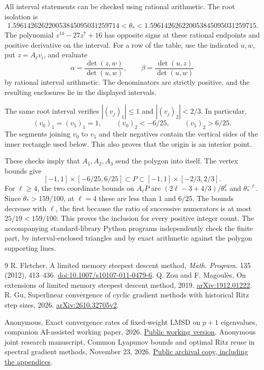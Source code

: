 \documentclass[11pt,a4paper]{article}
\numberwithin{equation}{section}
\begin{document}
All interval statements can be checked using rational arithmetic. The root isolation is
\[
\begin{split}
1.596142626220053845095031259714
 <\theta_*<
1.596142626220053845095031259715.
\end{split}
\]
The polynomial \(z^{14}-27z^7+16\) has opposite signs at these rational endpoints and positive derivative on the interval. For a row of the table, use the indicated \(u,w\), put \(z=A_\ell v_i\), and evaluate
\[
 \alpha=\frac{\det(z,w)}{\det(u,w)},\qquad
 \beta=\frac{\det(u,z)}{\det(u,w)}
\]
by rational interval arithmetic. The denominators are strictly positive, and the resulting enclosures lie in the displayed intervals.

The same root interval verifies \(|(v_j)_1|\le1\) and \(|(v_j)_2|<2/3\).
In particular,
\[
 (v_0)_1=(v_5)_1=1,\qquad
 (v_0)_2<-6/25,\qquad (v_5)_2>6/25.
\]
The segments joining \(v_0\) to \(v_5\) and their negatives contain the vertical sides of the inner rectangle used below. This also proves that the origin is an interior point.


These checks imply that \(A_1,A_2,A_3\) send the polygon into itself. The vertex bounds give
\[
 [-1,1]\times[-6/25,6/25]\subset P\subset[-1,1]\times[-2/3,2/3].
\]
For \(\ell\ge4\), the two coordinate bounds on \(A_\ell P\) are \((2\ell-3+4/3)/\theta_*^\ell\) and \(\theta_*^{-\ell}\). Since \(\theta_*>159/100\), at \(\ell=4\) these are less than \(1\) and \(6/25\). The bounds decrease with \(\ell\), the first because the ratio of successive numerators is at most \(25/19<159/100\). This proves the inclusion for every positive integer count. The accompanying standard-library Python programs independently check the finite part, by interval-enclosed triangles and by exact arithmetic against the polygon supporting lines.

\clearpage
\begin{thebibliography}{9}\setlength{\itemsep}{3pt}
 R. Fletcher, A limited memory steepest descent method, \emph{Math. Program.} 135 (2012), 413--436. \href{https://doi.org/10.1007/s10107-011-0479-6}{doi:10.1007/s10107-011-0479-6}.
 Q. Zou and F. Magoulès, On extensions of limited memory steepest descent method, 2019. \href{https://arxiv.org/abs/1912.01222}{arXiv:1912.01222}.
 R. Gu, Superlinear convergence of cyclic gradient methods with historical Ritz step sizes, 2026. \href{https://arxiv.org/abs/2610.32705v2}{arXiv:2610.32705v2}.

 Anonymous, Exact convergence rates of fixed-weight LMSD on \(p+1\) eigenvalues,
companion AI-assisted working paper, 2026.
\href{https://taitai2025.github.io/assets/documents/research/ritz-minimal-face.pdf}{Public working version}.
 Anonymous joint research manuscript,
Common Lyapunov bounds and optimal Ritz reuse in spectral gradient methods,
November 23, 2026. \href{https://taitai2025.github.io/assets/documents/research/lmsd-reuse.pdf}{Public archival copy, including the appendices}.
\end{thebibliography}
\end{document}

